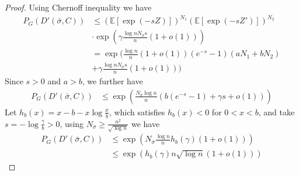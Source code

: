 \documentclass[entropy,article,submit,moreauthors,pdftex]{Definitions/mdpi}
\newcommand{\1}{\mathbbm{1}}
\begin{document}
\begin{proof}
	Using Chernoff inequality we have
	\begin{align*}
	P_G(D'(\bar{\sigma}, C))&
	\leq (\mathbb{E}[\exp(-s Z )])^{N_1} (\mathbb{E}[\exp(-s Z' )])^{N_2} \\
	&\cdot \exp(\gamma \frac{\log n N_{\bar{\sigma}} s}{n}(1+o(1))) \\
	&= \exp \Big( \frac{\log n}{n}(1+o(1))(e^{-s}-1)(aN_1 + bN_2) \\
	&+\gamma \frac{\log n N_{\bar{\sigma}} s}{n}(1+o(1))\Big)
	\end{align*}
	Since $s > 0$ and $a>b$, we further have
	\begin{align*}
	P_G(D'(\bar{\sigma}, C))
	& \leq \exp( \frac{N_{\bar{\sigma}}\log n }{n}(b(e^{-s}-1)+ \gamma s + o(1))) 
	\end{align*}
	Let $h_b(x) = x - b -x\log \frac{x}{b}$, which satisfies $h_b(x) < 0$ for $0<x<b$,
	and take $s=-\log\frac{\gamma}{b} > 0$, using 
	$N_{\bar{\sigma}} \geq \frac{n^2}{\sqrt{\log n}}$ we have
	\begin{align*}
	P_G(D'(\bar{\sigma}, C))&\leq \exp( N_{\bar{\sigma}} \frac{\log n}{n} h_b(\gamma)(1+o(1))) \\
	& \leq \exp (h_b(\gamma) n \sqrt{\log n} (1+o(1)))
	\end{align*}
\end{proof}
\end{document}
